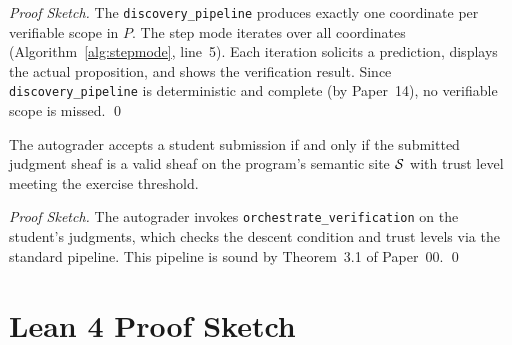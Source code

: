 \documentclass[11pt]{article}
\begin{document}
\begin{proof}[Proof Sketch]
The \texttt{discovery\_pipeline} produces exactly one coordinate per
verifiable scope in $P$. The step mode iterates over all coordinates
(Algorithm~\ref{alg:stepmode}, line~5). Each iteration solicits a prediction,
displays the actual proposition, and shows the verification result. Since
\texttt{discovery\_pipeline} is deterministic and complete (by Paper~14),
no verifiable scope is missed. \qed
\end{proof}

\begin{proposition}
The autograder accepts a student submission if and only if the submitted
judgment sheaf is a valid sheaf on the program's semantic site $\mathcal{S}$ with
trust level meeting the exercise threshold.
\end{proposition}

\begin{proof}[Proof Sketch]
The autograder invokes \texttt{orchestrate\_verification} on the student's
judgments, which checks the descent condition and trust levels via the
standard \JuGeo{} pipeline. This pipeline is sound by
Theorem~3.1 of Paper~00. \qed
\end{proof}

\section{Lean 4 Proof Sketch}\label{sec:lean}
\end{document}
